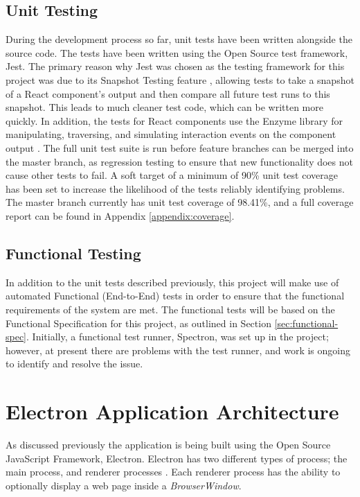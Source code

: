 \subsection{Unit Testing}
During the development process so far, unit tests have been written alongside the source code. The tests have been written using the Open Source test framework, Jest. The primary reason why Jest was chosen as the testing framework for this project was due to its Snapshot Testing feature \cite{jest-snapshot}, allowing tests to take a snapshot of a React component's output and then compare all future test runs to this snapshot. This leads to much cleaner test code, which can be written more quickly. In addition, the tests for React components use the Enzyme library for manipulating, traversing, and simulating interaction events on the component output \cite{enzyme}. The full unit test suite is run before feature branches can be merged into the master branch, as regression testing to ensure that new functionality does not cause other tests to fail. A soft target of a minimum of 90\% unit test coverage has been set to increase the likelihood of the tests reliably identifying problems. The master branch currently has unit test coverage of 98.41\%, and a full coverage report can be found in Appendix \ref{appendix:coverage}.

\subsection{Functional Testing}
In addition to the unit tests described previously, this project will make use of automated Functional (End-to-End) tests in order to ensure that the functional requirements of the system are met. The functional tests will be based on the Functional Specification for this project, as outlined in Section \ref{sec:functional-spec}. Initially, a functional test runner, Spectron, was set up in the project; however, at present there are problems with the test runner, and work is ongoing to identify and resolve the issue.

\section{Electron Application Architecture}
As discussed previously the application is being built using the Open Source JavaScript Framework, Electron. Electron has two different types of process; the main process, and renderer processes \cite{electron-architecture}. Each renderer process has the ability to optionally display a web page inside a \textit{BrowserWindow}. 

